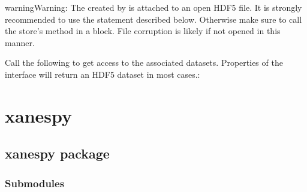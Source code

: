 \documentclass[letterpaper,10pt,english]{sphinxmanual}
\begin{document}
\begin{sphinxadmonition}{warning}{Warning:}
The  created by  is
attached to an open HDF5 file. It is strongly recommended to use
the  statement described below. Otherwise make sure to call
the store’s  method in a  block. File
corruption is likely if not opened in this manner.
\end{sphinxadmonition}

Call the following to get access to the associated datasets. Properties of the interface will
return an HDF5 dataset in most cases.:

\begin{sphinxVerbatim}[commandchars=\\\{\}]
   
  

   
          
        
\end{sphinxVerbatim}


\chapter{xanespy}
\label{\detokenize{modules::doc}}\label{\detokenize{modules:xanespy}}

\section{xanespy package}
\label{\detokenize{xanespy::doc}}\label{\detokenize{xanespy:xanespy-package}}

\subsection{Submodules}
\label{\detokenize{xanespy:submodules}}
\end{document}
